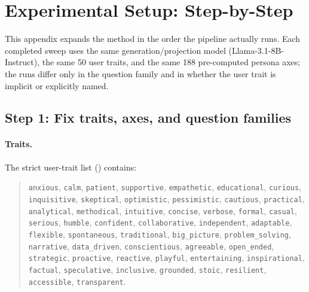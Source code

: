 \documentclass{article}
\newcommand{\ax}[1]{\texttt{#1}}   %
\begin{document}

\nocite{anthropicpsm,subliminallearning}


\appendix
\newpage

\section{Experimental Setup: Step-by-Step}
\label{app:setup}

This appendix expands the method in the order the pipeline actually runs. Each completed sweep uses the same generation/projection model (\mbox{Llama-3.1-8B-Instruct}), the same 50 user traits, and the same 188 pre-computed persona axes; the runs differ only in the question family and in whether the user trait is implicit or explicitly named.

\subsection{Step 1: Fix traits, axes, and question families}

\paragraph{Traits.}
The strict user-trait list () contains:
\begin{quote}\small
\ax{anxious}, \ax{calm}, \ax{patient}, \ax{supportive}, \ax{empathetic}, \ax{educational}, \ax{curious}, \ax{inquisitive}, \ax{skeptical}, \ax{optimistic}, \ax{pessimistic}, \ax{cautious}, \ax{practical}, \ax{analytical}, \ax{methodical}, \ax{intuitive}, \ax{concise}, \ax{verbose}, \ax{formal}, \ax{casual}, \ax{serious}, \ax{humble}, \ax{confident}, \ax{collaborative}, \ax{independent}, \ax{adaptable}, \ax{flexible}, \ax{spontaneous}, \ax{traditional}, \ax{big\_picture}, \ax{problem\_solving}, \ax{narrative}, \ax{data\_driven}, \ax{conscientious}, \ax{agreeable}, \ax{open\_ended}, \ax{strategic}, \ax{proactive}, \ax{reactive}, \ax{playful}, \ax{entertaining}, \ax{inspirational}, \ax{factual}, \ax{speculative}, \ax{inclusive}, \ax{grounded}, \ax{stoic}, \ax{resilient}, \ax{accessible}, \ax{transparent}.
\end{quote}
\end{document}
